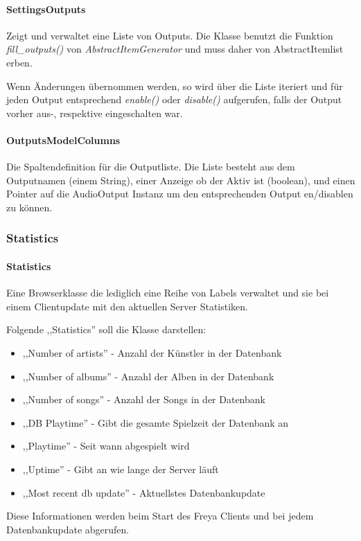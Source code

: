 \paragraph{SettingsOutputs}
Zeigt und verwaltet eine Liste von Outputs. Die Klasse benutzt die Funktion \textit{fill\_outputs()} von \emph{AbstractItemGenerator}
und muss daher von AbstractItemlist erben.

Wenn Änderungen übernommen werden, so wird über die Liste iteriert und für jeden Output entsprechend \emph{enable()} oder \emph{disable()} aufgerufen, 
falls der Output vorher aus-, respektive eingeschalten war.

\paragraph{OutputsModelColumns}
Die Spaltendefinition für die Outputliste.
Die Liste besteht aus dem Outputnamen (einem String), einer Anzeige ob der Aktiv ist (boolean),
und einen Pointer auf die AudioOutput Instanz um den entsprechenden Output en/disablen zu können.

\subsubsection{Statistics}
\paragraph{Statistics}
Eine Browserklasse die lediglich eine Reihe von Labels verwaltet und sie bei einem Clientupdate mit den aktuellen Server Statistiken.

Folgende ,,Statistics'' soll die Klasse darstellen:
\begin{itemize}
\item ,,Number of artists'' - Anzahl der Künstler in der Datenbank
\item ,,Number of albums'' - Anzahl der Alben in der Datenbank
\item ,,Number of songs'' - Anzahl der Songs in der Datenbank
\item ,,DB Playtime'' - Gibt die gesamte Spielzeit der Datenbank an
\item ,,Playtime'' - Seit wann abgespielt wird
\item ,,Uptime'' - Gibt an wie lange der Server läuft
\item ,,Most recent db update'' - Aktuellstes Datenbankupdate
\end{itemize}

Diese Informationen werden beim Start des Freya Clients und bei jedem Datenbankupdate abgerufen.
